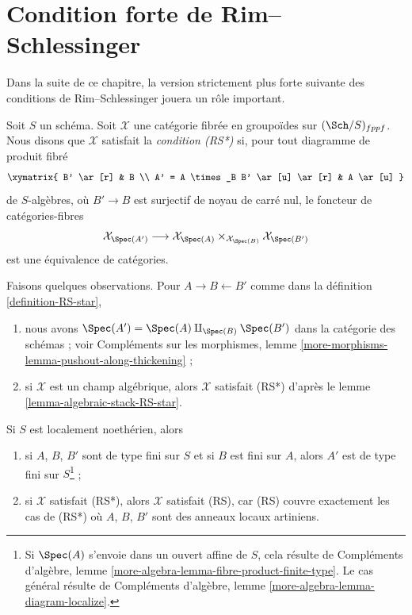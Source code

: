 \section{Condition forte de Rim--Schlessinger}
\label{section-RS-star}

\noindent
Dans la suite de ce chapitre, la version strictement plus forte suivante des
conditions de Rim--Schlessinger jouera un rôle important.

\begin{definition}
\label{definition-RS-star}
Soit $S$ un schéma. Soit $\mathcal{X}$ une catégorie fibrée en groupoïdes sur
$(\Sch/S)_{fppf}$. Nous disons que $\mathcal{X}$ satisfait la
{\it condition (RS*)} si, pour tout diagramme de produit fibré
$$
\xymatrix{
B' \ar[r] & B \\
A' = A \times_B B' \ar[u] \ar[r] & A \ar[u]
}
$$
de $S$-algèbres, où $B' \to B$ est surjectif de noyau de carré nul, le
foncteur de catégories-fibres
$$
\mathcal{X}_{\Spec(A')}
\longrightarrow
\mathcal{X}_{\Spec(A)} \times_{\mathcal{X}_{\Spec(B)}} \mathcal{X}_{\Spec(B')}
$$
est une équivalence de catégories.
\end{definition}

\noindent
Faisons quelques observations. Pour $A \to B \leftarrow B'$ comme dans la
définition \ref{definition-RS-star},
\begin{enumerate}
\item nous avons $\Spec(A') = \Spec(A) \amalg_{\Spec(B)} \Spec(B')$ dans la
catégorie des schémas ; voir Compléments sur les morphismes, lemme
\ref{more-morphisms-lemma-pushout-along-thickening} ;
\item si $\mathcal{X}$ est un champ algébrique, alors $\mathcal{X}$ satisfait
(RS*) d'après le lemme \ref{lemma-algebraic-stack-RS-star}.
\end{enumerate}
Si $S$ est localement noethérien, alors
\begin{enumerate}
\item[(3)] si $A$, $B$, $B'$ sont de type fini sur $S$ et si $B$ est fini sur
$A$, alors $A'$ est de type fini sur $S$\footnote{Si $\Spec(A)$ s'envoie dans
un ouvert affine de $S$, cela résulte de Compléments d'algèbre, lemme
\ref{more-algebra-lemma-fibre-product-finite-type}. Le cas général résulte de
Compléments d'algèbre, lemme \ref{more-algebra-lemma-diagram-localize}.} ;
\item[(4)] si $\mathcal{X}$ satisfait (RS*), alors $\mathcal{X}$ satisfait
(RS), car (RS) couvre exactement les cas de (RS*) où $A$, $B$, $B'$ sont des
anneaux locaux artiniens.
\end{enumerate}

